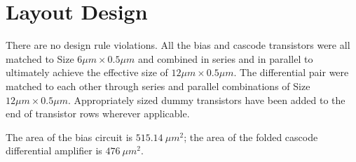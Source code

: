 \documentclass[11pt]{article}
\begin{document}
\FloatBarrier
\section{Layout Design}
    There are no design rule violations. All the bias and cascode transistors were all matched to Size $6\mu m \times 0.5\mu m$ and combined in series and in parallel to ultimately achieve the effective size of $12\mu m \times 0.5\mu m$. The differential pair were matched to each other through series and parallel combinations of Size $12\mu m \times 0.5\mu m$. Appropriately sized dummy transistors have been added to the end of transistor rows wherever applicable.

    The area of the bias circuit is $515.14\ \mu m^2$; the area of the folded cascode differential amplifier is $476\ \mu m^2$.
\end{document}
